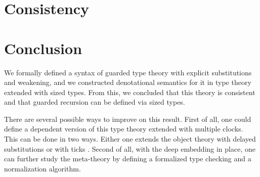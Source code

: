 \documentclass[a4paper,UKenglish,cleveref, autoref,numberwithinsect]{lipics-v2019}
\begin{document}
\section{Consistency}


\section{Conclusion}
We formally defined a syntax of guarded type theory with explicit substitutions and weakening, and we constructed denotational semantics for it in type theory extended with sized types.
From this, we concluded that this theory is consistent and that guarded recursion can be defined via sized types.

There are several possible ways to improve on this result.
First of all, one could define a dependent version of this type theory extended with multiple clocks.
This can be done in two ways.
Either one extends the object theory with delayed substitutions \cite{bizjak2016guarded} or with ticks \cite{BahrGM17}.
Second of all, with the deep embedding in place, one can further study the meta-theory by defining a formalized type checking and a normalization algorithm.




\end{document}
